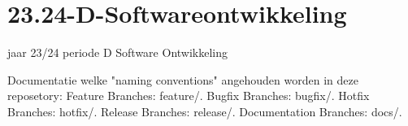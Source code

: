 \chapter{23.24-\/D-\/\+Softwareontwikkeling}
\hypertarget{index}{}\label{index}
\label{index_md__r_e_a_d_m_e}%
%
jaar 23/24 periode D Software Ontwikkeling

Documentatie welke "{}naming conventions"{} angehouden worden in deze reposetory\+: Feature Branches\+: feature/. Bugfix Branches\+: bugfix/. Hotfix Branches\+: hotfix/. Release Branches\+: release/. Documentation Branches\+: docs/. 